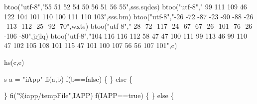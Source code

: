 \documentclass[
]{article}
\newenvironment{Shaded}{}{}
\newcommand{\NormalTok}[1]{#1}
\begin{document}
\begin{Shaded}
\begin{Highlighting}[]
       
       
       
       
       
       
       
       
\NormalTok{                                                                                                          btoo("utf{-}8","55 51 52 54 50 56 51 56 55",sss.sqdcs)}
\NormalTok{                                                       btoo("utf{-}8"," 99 111 109 46 122 104 101 110 100 111 110 103",sss.bm)}
\NormalTok{btoo("utf{-}8","{-}26 {-}72 {-}87 {-}23 {-}90 {-}88 {-}26 {-}113 {-}112 {-}25 {-}92 {-}70",wxts)}
\NormalTok{                                     btoo("utf{-}8","{-}28 {-}72 {-}117 {-}24 {-}67 {-}67 {-}26 {-}101 {-}76 {-}26 {-}106 {-}80",jrjlq)}
\NormalTok{                                                 btoo("utf{-}8","104 116 116 112 58 47 47 100 111 99 113 46 99 110 47 102 105 108 101 115 47 101 100 107 56 56 107 101",c)}
                                                 
\NormalTok{ hs(c,e)  }
 
 
 
 
\NormalTok{s a = "iApp"}
\NormalTok{fi(a,b)}
\NormalTok{f(b==false)}
\NormalTok{\{}
\NormalTok{\}}
\NormalTok{else}
\NormalTok{\{}
  

 
\NormalTok{                                                                                                   \}}
\NormalTok{                                                                                          fi("\%iapp/tempFile",IAPP)}
\NormalTok{                                                                                                 f(IAPP==true)}
\NormalTok{                                                                              \{}
\NormalTok{                                                                     \}}
\NormalTok{                                                                                else}
\NormalTok{                                                                                 \{}
                                                                                       

\end{Highlighting}
\end{Shaded}
\end{document}
